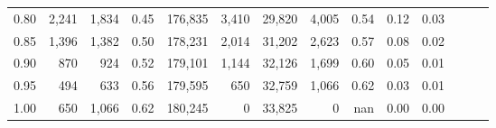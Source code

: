 \begin{tabular}{rrrrrrrrrrrrrr}
0.80 &   2,241 &  1,834 &  0.45 &  176,835 &    3,410 &  29,820 &   4,005 &  0.54 &  0.12 &      0.03 \\
0.85 &   1,396 &  1,382 &  0.50 &  178,231 &    2,014 &  31,202 &   2,623 &  0.57 &  0.08 &      0.02 \\
0.90 &     870 &    924 &  0.52 &  179,101 &    1,144 &  32,126 &   1,699 &  0.60 &  0.05 &      0.01 \\
0.95 &     494 &    633 &  0.56 &  179,595 &      650 &  32,759 &   1,066 &  0.62 &  0.03 &      0.01 \\
1.00 &     650 &  1,066 &  0.62 &  180,245 &        0 &  33,825 &       0 &   nan &  0.00 &      0.00 \\
\bottomrule
\end{tabular}
